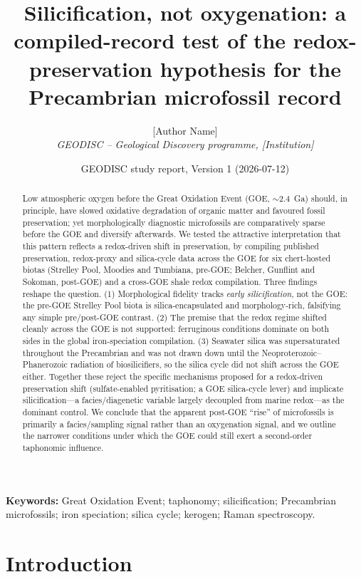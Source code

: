 \documentclass[11pt]{article}
\title{\vspace{-1.0cm}\textbf{Silicification, not oxygenation: a compiled-record test of the
redox-preservation hypothesis for the Precambrian microfossil record}}
\author{[Author Name]\\
\small\textit{GEODISC -- Geological Discovery programme, [Institution]}}
\date{\small GEODISC study report, Version 1 (2026-07-12)}
\begin{document}
\maketitle

\begin{abstract}\small
\noindent Low atmospheric oxygen before the Great Oxidation Event (GOE, $\sim$2.4~Ga) should, in
principle, have slowed oxidative degradation of organic matter and favoured fossil preservation; yet
morphologically diagnostic microfossils are comparatively sparse before the GOE and diversify
afterwards. We tested the attractive interpretation that this pattern reflects a redox-driven shift
in preservation, by compiling published preservation, redox-proxy and silica-cycle data across the
GOE for six chert-hosted biotas (Strelley Pool, Moodies and Tumbiana, pre-GOE; Belcher, Gunflint and
Sokoman, post-GOE) and a cross-GOE shale redox compilation. Three findings reshape the question.
(1) Morphological fidelity tracks \emph{early silicification}, not the GOE: the pre-GOE Strelley
Pool biota is silica-encapsulated and morphology-rich, falsifying any simple pre/post-GOE contrast.
(2) The premise that the redox regime shifted cleanly across the GOE is not supported:
ferruginous conditions dominate on both sides in the global iron-speciation compilation. (3)
Seawater silica was supersaturated throughout the Precambrian and was not drawn down until the
Neoproterozoic--Phanerozoic radiation of biosilicifiers, so the silica cycle did not shift across
the GOE either. Together these reject the specific mechanisms proposed for a redox-driven
preservation shift (sulfate-enabled pyritisation; a GOE silica-cycle lever) and implicate
silicification---a facies/diagenetic variable largely decoupled from marine redox---as the dominant
control. We conclude that the apparent post-GOE ``rise'' of microfossils is primarily a
facies/sampling signal rather than an oxygenation signal, and we outline the narrower conditions
under which the GOE could still exert a second-order taphonomic influence.
\end{abstract}

\noindent\textbf{Keywords:} Great Oxidation Event; taphonomy; silicification; Precambrian microfossils;
iron speciation; silica cycle; kerogen; Raman spectroscopy.

\section{Introduction}
\end{document}
